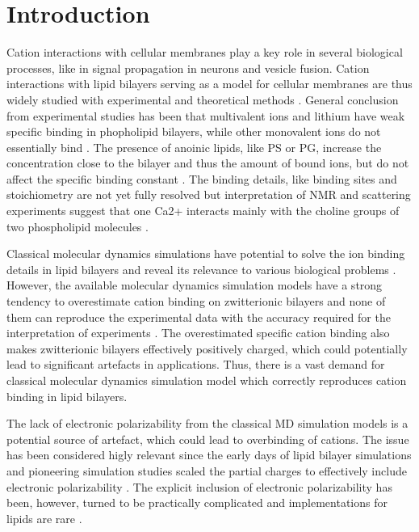 \documentclass[aip,jcp,twocolumn]{revtex4}
\begin{document}
\section{Introduction}
Cation interactions with cellular membranes play a key role in several biological processes,
like in signal propagation in neurons and vesicle fusion.
Cation interactions with lipid bilayers serving as a model for cellular
membranes are thus widely studied with experimental \cite{cevc90,tocanne90,binder02,pabst07,uhrikova08}
and theoretical methods \cite{Berkowitz12,??}. General conclusion from experimental
studies has been that multivalent ions and lithium have weak specific binding in
phopholipid bilayers, while other monovalent ions do not essentially
bind \cite{cevc90,tocanne90,seelig90,binder02}. The presence of anoinic lipids, like PS or PG,
increase the concentration close to the bilayer and thus the amount of bound
ions, but do not affect the specific binding constant \cite{seelig90}.
The binding details, like binding sites and stoichiometry are not yet fully
resolved but interpretation of NMR and scattering experiments suggest that one
Ca2+ interacts mainly with the choline groups \cite{hauser76,hauser78,herbette84} of two
phospholipid molecules \cite{altenbach84}.

Classical molecular dynamics simulations have potential to solve the ion binding details
in lipid bilayers and reveal its relevance to various biological
problems \cite{bockmann03,bockmann04,??}. However, the available
molecular dynamics simulation models have a strong tendency to overestimate
cation binding on zwitterionic bilayers and none of them can reproduce the
experimental data with the accuracy required for the interpretation of
experiments \cite{catte16}. The overestimated specific cation binding also
makes zwitterionic bilayers effectively positively charged, which could
potentially lead to significant artefacts in applications.
Thus, there is a vast demand for classical molecular dynamics simulation
model which correctly reproduces cation binding in lipid bilayers. 

The lack of electronic polarizability from the classical MD simulation
models is a potential source of artefact, which could lead to overbinding
of cations. 
The issue has been considered higly relevant since the early days of
lipid bilayer simulations and pioneering simulation studies scaled
the partial charges to effectively include electronic
polarizability \cite{jonsson86,egberts94}. The explicit inclusion of
electronic polarizability has been, however, turned to be 
practically complicated and implementations for lipids are rare \cite{chowdhary13}.
\end{document}
